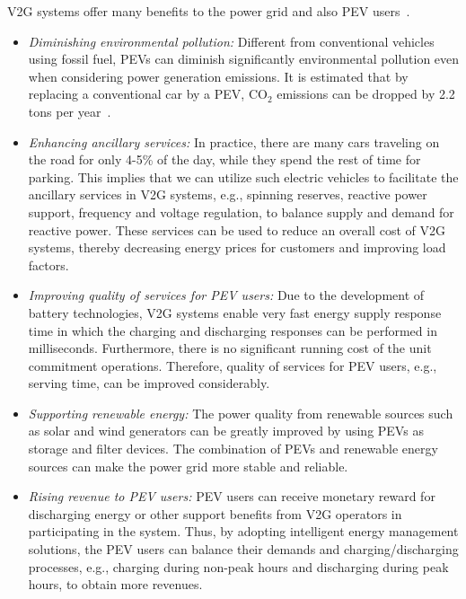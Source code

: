 \documentclass[twocolumn,10pt]{IEEEtran}
\begin{document}
V2G systems offer many benefits to the power grid and also PEV users~\cite{Yang2011P2}. 
\begin{itemize}
\item \emph{Diminishing environmental pollution:} Different from conventional vehicles using fossil fuel, PEVs can diminish significantly environmental pollution even when considering power generation emissions. It is estimated that by replacing a conventional car by a PEV, CO$_2$ emissions can be dropped by 2.2 tons per year~\cite{Islam2014Integrating}. 
\item \emph{Enhancing ancillary services:} In practice, there are many cars traveling on the road for only 4-5\% of the day, while they spend the rest of time for parking. This implies that we can utilize such electric vehicles to facilitate the ancillary services in V2G systems, e.g., spinning reserves, reactive power support, frequency and voltage regulation, to balance supply and demand for reactive power. These services can be used to reduce an overall cost of V2G systems, thereby decreasing energy prices for customers and improving load factors.  
\item \emph{Improving quality of services for PEV users:} Due to the development of battery technologies, V2G systems enable very fast energy supply response time in which the charging and discharging responses can be performed in milliseconds. Furthermore, there is no significant running cost of the unit commitment operations. Therefore, quality of services for PEV users, e.g., serving time, can be improved considerably. 
\item \emph{Supporting renewable energy:} The power quality from renewable sources such as solar and wind generators can be greatly improved by using PEVs as storage and filter devices. The combination of PEVs and renewable energy sources can make the power grid more stable and reliable.
\item \emph{Rising revenue to PEV users:} PEV users can receive monetary reward for discharging energy or other support benefits from V2G operators in participating in the system. Thus, by adopting intelligent energy management solutions, the PEV users can balance their demands and charging/discharging processes, e.g., charging during non-peak hours and discharging during peak hours, to obtain more revenues. 
\end{itemize}
\end{document}
